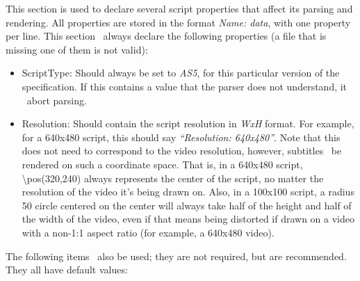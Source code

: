 \documentclass{spec}
\begin{document}
This section is used to declare several script properties that affect its parsing and rendering.
All properties are stored in the format \textit{Name: data}, with one property per line. 
This section \must\ always declare the following properties (a file that is missing one of them is not valid):

\begin{itemize}
\item ScriptType: Should always be set to \textit{AS5}, for this particular version of the specification.
If this contains a value that the parser does not understand, it \must\ abort parsing.
\item Resolution: Should contain the script resolution in \textit{WxH} format. For example, for a 640x480
script, this should say \textit{``Resolution: 640x480''}. Note that this does not need to correspond to the
video resolution, however, subtitles \must\ be rendered on such a coordinate space. That is, in a
640x480 script, \textbackslash{pos(320,240)} always represents the center of the script, no matter the
resolution of the video it's being drawn on. Also, in a 100x100 script, a radius 50 circle centered on
the center will always take half of the height and half of the width of the video, even if that means
being distorted if drawn on a video with a non-1:1 aspect ratio (for example, a 640x480 video).
\end{itemize}

The following items \may\ also be used; they are not required, but are recommended. They all have default values:
\end{document}

